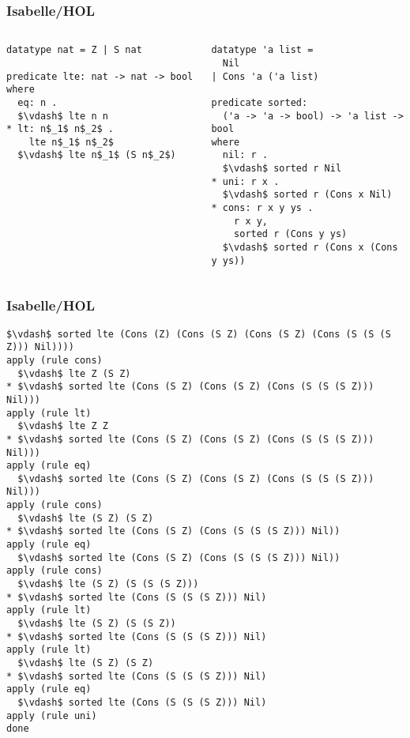 \documentclass{beamer}
\begin{document}
\begin{frame}[fragile]
	\frametitle{Isabelle/HOL}
\begin{columns}
\begin{column}{0.5\textwidth}
\begin{lstlisting}[language=logic, mathescape]
datatype nat = Z | S nat

predicate lte: nat -> nat -> bool where
  eq: n . 
  $\vdash$ lte n n
* lt: n$_1$ n$_2$ . 
    lte n$_1$ n$_2$ 
  $\vdash$ lte n$_1$ (S n$_2$)
\end{lstlisting}
\end{column}

\begin{column}{0.5\textwidth}
\begin{lstlisting}[language=logic, mathescape]
datatype 'a list =
  Nil
| Cons 'a ('a list)
 
predicate sorted:
  ('a -> 'a -> bool) -> 'a list -> bool
where
  nil: r . 
  $\vdash$ sorted r Nil
* uni: r x . 
  $\vdash$ sorted r (Cons x Nil)
* cons: r x y ys .
    r x y,
    sorted r (Cons y ys)
  $\vdash$ sorted r (Cons x (Cons y ys))
\end{lstlisting}
\end{column}
\end{columns}
\end{frame}





\begin{frame}[fragile]
\frametitle{Isabelle/HOL}
\begin{lstlisting}[language=logic, mathescape]
$\vdash$ sorted lte (Cons (Z) (Cons (S Z) (Cons (S Z) (Cons (S (S (S Z))) Nil))))
apply (rule cons)
  $\vdash$ lte Z (S Z)
* $\vdash$ sorted lte (Cons (S Z) (Cons (S Z) (Cons (S (S (S Z))) Nil)))
apply (rule lt)
  $\vdash$ lte Z Z
* $\vdash$ sorted lte (Cons (S Z) (Cons (S Z) (Cons (S (S (S Z))) Nil)))
apply (rule eq)
  $\vdash$ sorted lte (Cons (S Z) (Cons (S Z) (Cons (S (S (S Z))) Nil)))
apply (rule cons)
  $\vdash$ lte (S Z) (S Z)
* $\vdash$ sorted lte (Cons (S Z) (Cons (S (S (S Z))) Nil))
apply (rule eq)
  $\vdash$ sorted lte (Cons (S Z) (Cons (S (S (S Z))) Nil))
apply (rule cons)
  $\vdash$ lte (S Z) (S (S (S Z)))
* $\vdash$ sorted lte (Cons (S (S (S Z))) Nil)
apply (rule lt)
  $\vdash$ lte (S Z) (S (S Z))
* $\vdash$ sorted lte (Cons (S (S (S Z))) Nil)
apply (rule lt)
  $\vdash$ lte (S Z) (S Z)
* $\vdash$ sorted lte (Cons (S (S (S Z))) Nil)
apply (rule eq)
  $\vdash$ sorted lte (Cons (S (S (S Z))) Nil)
apply (rule uni)
done
\end{lstlisting}
\end{frame}
\end{document}
